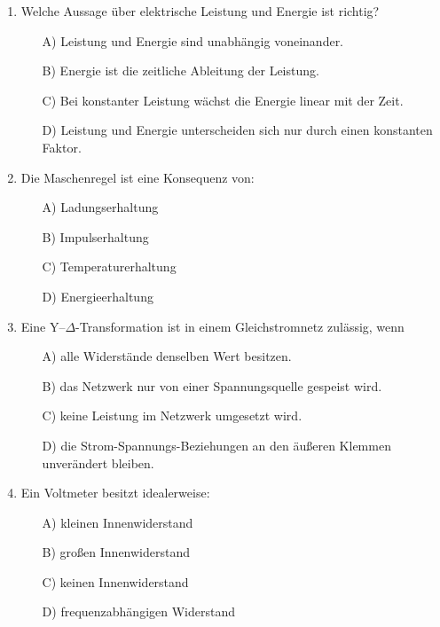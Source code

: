 \documentclass[a4paper,12pt]{article}
\newif\ifshowsolutions
\begin{document}
\begin{enumerate}[label=\textbf{\arabic*.}, leftmargin=*, itemsep=8pt]
  \item Welche Aussage über elektrische Leistung und Energie ist richtig?
    \begin{itemize}[label=$\square$]
      \item[A)] Leistung und Energie sind unabhängig voneinander.
      \item[B)] Energie ist die zeitliche Ableitung der Leistung.
      \item[C)] Bei konstanter Leistung wächst die Energie linear mit der Zeit.
      \item[D)] Leistung und Energie unterscheiden sich nur durch einen konstanten Faktor.
    \end{itemize}

\ifshowsolutions
Lösung: C
\fi

  \item Die Maschenregel ist eine Konsequenz von:
    \begin{itemize}[label=$\square$]
      \item[A)] Ladungserhaltung
      \item[B)] Impulserhaltung
      \item[C)] Temperaturerhaltung
      \item[D)] Energieerhaltung
    \end{itemize}

\ifshowsolutions
Lösung: D
\fi

  \item Eine Y–$\Delta$-Transformation ist in einem Gleichstromnetz zulässig, wenn
    \begin{itemize}[label=$\square$]
      \item[A)] alle Widerstände denselben Wert besitzen.
      \item[B)] das Netzwerk nur von einer Spannungsquelle gespeist wird.
      \item[C)] keine Leistung im Netzwerk umgesetzt wird.
      \item[D)] die Strom-Spannungs-Beziehungen an den äußeren Klemmen unverändert bleiben.
    \end{itemize}

\ifshowsolutions
Lösung: D
\fi

  \item Ein Voltmeter besitzt idealerweise:
    \begin{itemize}[label=$\square$]
      \item[A)] kleinen Innenwiderstand
      \item[B)] großen Innenwiderstand
      \item[C)] keinen Innenwiderstand
      \item[D)] frequenzabhängigen Widerstand
    \end{itemize}


\end{enumerate}
\end{document}
